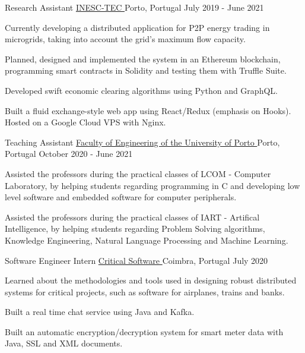 
\begin{cventries}
  \cventry
    {Research Assistant} %
    {\href{https://www.inesctec.pt/en}{INESC-TEC \faExternalLink}} %
    {Porto, Portugal} %
    {July 2019 - June 2021} %
    {
      \begin{cvitems} %
        \item {Currently developing a distributed application for P2P energy trading in microgrids, taking into account the grid's maximum flow capacity.}
        \item {Planned, designed and implemented the system in an Ethereum blockchain, programming smart contracts in Solidity and testing them with Truffle Suite.}
        \item {Developed swift economic clearing algorithms using Python and GraphQL.}
        \item {Built a fluid exchange-style web app using React/Redux (emphasis on Hooks). Hosted on a Google Cloud VPS with Nginx.}
      \end{cvitems}
    }

    \cventry
    {Teaching Assistant} %
    {\href{https://sigarra.up.pt/feup/en/ucurr_geral.ficha_uc_view?pv_ocorrencia_id=459473}{Faculty of Engineering of the University of Porto \faExternalLink}} %
    {Porto, Portugal} %
    {October 2020 - June 2021} %
    {
      \begin{cvitems} %
        \item {Assisted the professors during the practical classes of LCOM - Computer Laboratory, by helping students regarding programming in C and developing low level software and embedded software for computer peripherals.}
        \item {Assisted the professors during the practical classes of IART - Artifical Intelligence, by helping students regarding Problem Solving algorithms, Knowledge Engineering, Natural Language Processing and Machine Learning.}
      \end{cvitems}
    }

  \cventry
    {Software Engineer Intern} %
    {\href{https://www.criticalsoftware.com/en}{Critical Software \faExternalLink}} %
    {Coimbra, Portugal} %
    {July 2020} %
    {
      \begin{cvitems} %
        \item {Learned about the methodologies and tools used in designing robust distributed systems for critical projects, such as software for airplanes, trains and banks.}
        \item {Built a real time chat service using Java and Kafka.}
        \item {Built an automatic encryption/decryption system for smart meter data with Java, SSL and XML documents.}
      \end{cvitems}
    }


\end{cventries}

